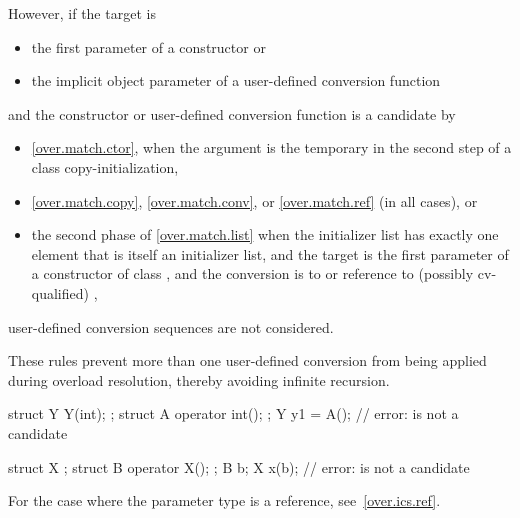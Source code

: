 \pnum
However, if the target is
\begin{itemize}
\item the first parameter of a constructor or
\item the implicit object parameter of a user-defined conversion function
\end{itemize}
and the constructor or user-defined conversion function is a candidate by
\begin{itemize}
\item \ref{over.match.ctor}, when the argument is the temporary in the second
step of a class copy-initialization,
\item \ref{over.match.copy}, \ref{over.match.conv}, or \ref{over.match.ref}
(in all cases), or
\item the second phase of \ref{over.match.list}
when the initializer list has exactly one element that
is itself an initializer list, and
the target is the first parameter of a constructor of class , and
the conversion is to  or reference to (possibly cv-qualified) ,
\end{itemize}
user-defined conversion sequences are not considered.
\begin{note}
These rules prevent more than one user-defined conversion from being
applied during overload resolution, thereby avoiding infinite recursion.
\end{note}
\begin{example}
\begin{codeblock}
  struct Y { Y(int); };
  struct A { operator int(); };
  Y y1 = A();  // error:  is not a candidate

  struct X { };
  struct B { operator X(); };
  B b;
  X x({b});    // error:  is not a candidate
\end{codeblock}
\end{example}

\pnum
For the case where the parameter type is a reference, see~\ref{over.ics.ref}.

